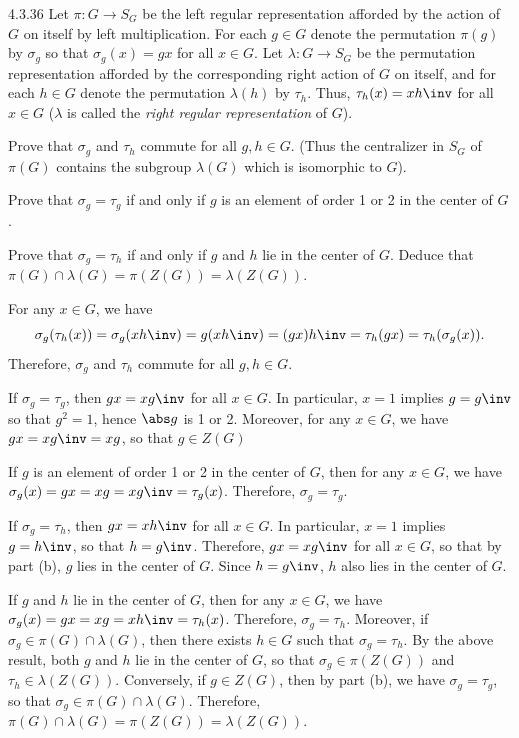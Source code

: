 \begin{spex}{4.3.36}
	Let $\pi : G \to S_G$ be the left regular representation afforded by the action of $G$ on itself by left multiplication.
	For each $g \in G$ denote the permutation $\pi(g)$ by $\sigma_g$ so that $\sigma_g(x) = gx$ for all $x \in G$.
	Let $\lambda : G \to S_G$ be the permutation representation afforded by the corresponding right action of $G$ on itself, and for each $h \in G$ denote the permutation $\lambda(h)$ by $\tau_h$.
	Thus, $\tau_h(x) = xh\inv$ for all $x \in G$ ($\lambda$ is called the \emph{right regular representation} of $G$).
	\begin{subexercises}
		\item Prove that $\sigma_g$ and $\tau_h$ commute for all $g, h \in G$. (Thus the centralizer in $S_G$ of $\pi(G)$ contains the subgroup $\lambda(G)$ which is isomorphic to $G$).
		\item Prove that $\sigma_g = \tau_g$ if and only if $g$ is an element of order 1 or 2 in the center of $G$.
		\item Prove that $\sigma_g = \tau_h$ if and only if $g$ and $h$ lie in the center of $G$.
	Deduce that $\pi(G) \cap \lambda(G) = \pi(Z(G)) = \lambda(Z(G))$.
	\end{subexercises}
\end{spex}

\begin{solenum}[spsol]
	\item For any $x \in G$, we have
	\[
		\sigma_g(\tau_h(x)) = \sigma_g(xh\inv) = g(xh\inv) = (gx)h\inv = \tau_h(gx) = \tau_h(\sigma_g(x)).
	\]
	Therefore, $\sigma_g$ and $\tau_h$ commute for all $g, h \in G$.
	\item If $\sigma_g = \tau_g$, then $gx = xg\inv$ for all $x \in G$.
	In particular, $x = 1$ implies $g = g\inv$ so that $g^2 = 1$, hence $\abs g$ is 1 or 2.
	Moreover, for any $x \in G$, we have $gx = xg\inv = xg$, so that $g \in Z(G)$
	
	If $g$ is an element of order 1 or 2 in the center of $G$, then for any $x \in G$, we have $\sigma_g(x) = gx = xg = xg\inv = \tau_g(x)$.
	Therefore, $\sigma_g = \tau_g$.
	\item If $\sigma_g = \tau_h$, then $gx = xh\inv$ for all $x \in G$.
	In particular, $x = 1$ implies $g = h\inv$, so that $h = g\inv$.
	Therefore, $gx = xg\inv$ for all $x \in G$, so that by part (b), $g$ lies in the center of $G$.
	Since $h = g\inv$, $h$ also lies in the center of $G$.
	
	If $g$ and $h$ lie in the center of $G$, then for any $x \in G$, we have $\sigma_g(x) = gx = xg = xh\inv = \tau_h(x)$.
	Therefore, $\sigma_g = \tau_h$.
	Moreover, if $\sigma_g \in \pi(G) \cap \lambda(G)$, then there exists $h \in G$ such that $\sigma_g = \tau_h$.
	By the above result, both $g$ and $h$ lie in the center of $G$, so that $\sigma_g \in \pi(Z(G))$ and $\tau_h \in \lambda(Z(G))$.
	Conversely, if $g \in Z(G)$, then by part (b), we have $\sigma_g = \tau_g$, so that $\sigma_g \in \pi(G) \cap \lambda(G)$.
	Therefore, $\pi(G) \cap \lambda(G) = \pi(Z(G)) = \lambda(Z(G))$.
\end{solenum}